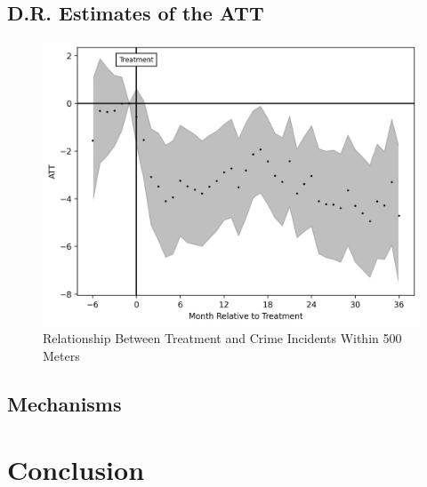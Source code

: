 \documentclass[12pt]{article}
\begin{document}
    \subsection{D.R. Estimates of the ATT}
    \begin{figure}[H]
        \centering
        \includegraphics{output/group_0_crimes_500m/figures/att_gt_dr_event_study_long_horizon.png}
        \caption{Relationship Between Treatment and Crime Incidents Within 500 Meters}
        \label{fig:my_label}
    \end{figure}

    \subsection{Mechanisms}


    


\section{Conclusion} \label{sec:conclusion}





\clearpage

\onehalfspacing

%
\end{document}

